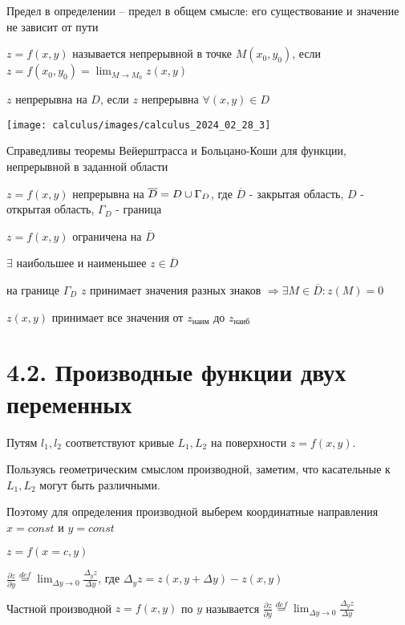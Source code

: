 \documentclass[12pt]{article}
\begin{document}
    Предел в определении -- предел в общем смысле: его существование и значение не зависит от пути

    \hypertarget{continuityoffunctionoftwovariables}{}
    \Def $z = f(x, y)$ называется непрерывной в точке $M(x_0, y_0)$, если $z = f(x_0, y_0) = \lim_{M \to M_0} z(x, y)$

    $z$ непрерывна на $D$, если $z$ непрерывна $\forall (x, y) \in D$

    \texttt{[image: calculus/images/calculus\_2024\_02\_28\_3]}

    \Nota Справедливы теоремы Вейерштрасса и Больцано-Коши для функции, непрерывной в заданной области

    $z = f(x, y)$ непрерывна на $\overline{D} = D \cup \Gamma_D$, где $\overline{D}$ - закрытая область, $D$ - открытая область, $\Gamma_D$ - граница

     $z = f(x, y)$ ограничена на $\overline{D}$

     $\exists$ наибольшее и наименьшее $z \in \overline{D}$

     на границе $\Gamma_D$ $z$ принимает значения разных знаков $\Longrightarrow \exists M \in \overline{D} : z(M) = 0$

     $z(x, y)$ принимает все значения от $z_{\text{наим}}$ до $z_{\text{наиб}}$ \\[1\baselineskip]

    \section{4.2. Производные функции двух переменных}

    Путям $l_1, l_2$ соответствуют кривые $L_1, L_2$ на поверхности $z = f(x, y)$.

    Пользуясь геометрическим смыслом производной, заметим, что касательные к $L_1, L_2$ могут быть различными.


    Поэтому для определения производной выберем координатные направления $x = const$ и $y = const$

    $z = f(x = c, y)$

    \hypertarget{partialderivativeoffunctionoftwovariables}{}

    $\displaystyle \frac{\partial z}{\partial y} \stackrel{def}{=} \lim_{\Delta y \to 0} \frac{\Delta_y z}{\Delta y}$,
    где $\Delta_y z = z(x, y + \Delta y) - z(x, y)$

    \Def Частной производной $z = f(x, y)$ по $y$ называется $\displaystyle \frac{\partial z}{\partial y} \stackrel{def}{=} \lim_{\Delta y \to 0} \frac{\Delta_y z}{\Delta y}$
\end{document}
